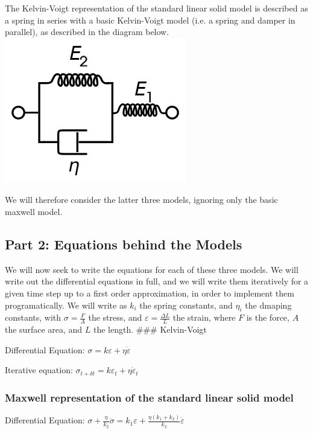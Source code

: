 \documentclass[11pt]{article}
\makeatletter
\def\maxwidth{\ifdim\Gin@nat@width>\linewidth\linewidth
    \else\Gin@nat@width\fi}
\let\Oldincludegraphics\includegraphics
\renewcommand{\includegraphics}[1]{\Oldincludegraphics[width=.8\maxwidth]{#1}}
\newcommand{\eps}{\varepsilon}
\makeatother
\begin{document}
The Kelvin-Voigt representation of the standard linear solid model is
described as a spring in series with a basic Kelvin-Voigt model (i.e. a
spring and damper in parallel), as described in the diagram below.
\includegraphics{images/standard-kelvin-voigt.png}

We will therefore consider the latter three models, ignoring only the
basic maxwell model.

    \subsection{Part 2: Equations behind the
Models}\label{part-2-equations-behind-the-models}

We will now seek to write the
equations for each of these three models. We will write out the
differential equations in full, and we will write them iteratively for a
given time step up to a first order approximation, in order to implement
them programatically. We will write as $k_i$ the spring constants, and
$\eta_i$ the dmaping constants, with $\sigma = \frac{F}{A}$ the
stress, and $\eps = \frac{\Delta L}{L}$ the strain, where $F$ is the
force, $A$ the surface area, and $L$ the length. \#\#\# Kelvin-Voigt

Differential Equation: $\sigma = k\eps + \eta \dot{\eps}$

Iterative equation:
$\sigma_{t+\delta t} = k \eps_t + \eta \dot{\eps}_t$

\subsubsection{Maxwell representation of the standard linear solid
model}\label{maxwell-representation-of-the-standard-linear-solid-model}

Differential Equation:
$\sigma + \frac{\eta}{k_2}\dot{\sigma} = k_1\eps + \frac{\eta(k_1 + k_2)}{k_2}\dot{\eps}$
\end{document}
